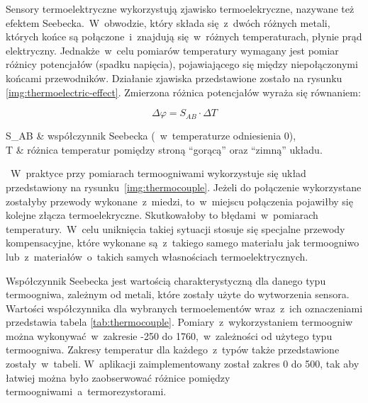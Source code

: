 Sensory termoelektryczne wykorzystują zjawisko termoelekryczne, nazywane też efektem
Seebecka.~W~obwodzie, który składa się~z~dwóch różnych metali, których końce są połączone~i~znajdują
się~w~różnych temperaturach, płynie prąd elektryczny. Jednakże~w~celu pomiarów temperatury wymagany
jest pomiar różnicy potencjałów (spadku napięcia), pojawiającego się między niepołączonymi końcami
przewodników. Działanie zjawiska przedstawione zostało na rysunku \ref{img:thermoelectric-effect}.
Zmierzona różnica potencjałów wyraża się równaniem:

\begin{equation}
  \Delta \varphi = S_{AB}\cdot\Delta T
\end{equation}

\begin{eqparams}
  S_{AB} & współczynnik Seebecka (~w~temperaturze odniesienia 0\degC), \\
  \Delta T & różnica temperatur pomiędzy stroną \enquote{gorącą} oraz \enquote{zimną} układu.
\end{eqparams}

 ~W~praktyce przy pomiarach termoogniwami wykorzystuje się
układ przedstawiony na rysunku~\ref{img:thermocouple}. Jeżeli do połączenie wykorzystane zostałyby
przewody wykonane~z~miedzi, to~w~miejscu połączenia pojawiłby się kolejne złącza termoelekryczne.
Skutkowałoby to błędami~w~pomiarach temperatury.~W~celu uniknięcia takiej sytuacji stosuje się
specjalne przewody kompensacyjne, które wykonane są~z~takiego samego materiału jak termoogniwo
lub~z~materiałów~o~takich samych własnościach termoelektrycznych.


Współczynnik Seebecka jest wartością charakterystyczną dla danego typu termoogniwa, zależnym od
metali, które zostały użyte do wytworzenia sensora. Wartości współczynnika \cite{thermocouple} dla
wybranych termoelementów wraz~z~ich oznaczeniami przedstawia tabela \ref{tab:thermocouple}.
Pomiary~z~wykorzystaniem termoogniw można wykonywać~w~zakresie -250 do 1760\degC,~w~zależności od
użytego typu termoogniwa. Zakresy temperatur dla każdego~z~typów także przedstawione
zostały~w~tabeli. W~aplikacji zaimplementowany został zakres 0 do 500\degC, tak aby łatwiej można
było zaobserwować różnice pomiędzy termoogniwami~a~termorezystorami.

